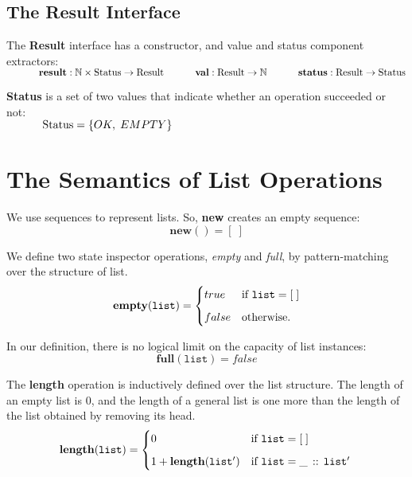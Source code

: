 \documentclass[10pt]{article}
\begin{document}
  \subsection{The Result Interface}
  The \textbf{Result} interface has a constructor, and value and status component extractors:
  \vspace*{6pt}\\\(
  \hspace*{32pt}\textbf{result}: \mathbb{N} \times \mathrm{Status} \rightarrow \mathrm{Result}\vspace*{4pt}\\
  \hspace*{32pt}\textbf{val}: \mathrm{Result} \rightarrow \mathbb{N}\vspace*{4pt}\\
  \hspace*{32pt}\textbf{status}: \mathrm{Result} \rightarrow \mathrm{Status}
  \)\vspace*{6pt}  
  
  \textbf{Status} is a set of two values that indicate whether an operation succeeded or not: 
   \vspace*{6pt}\\\(\hspace*{32pt}\mathrm{Status} = \{OK, \; EMPTY\} \)

  \section{The Semantics of List Operations}
  \noindent We use sequences to represent lists. So, \textbf{new} creates an empty sequence:
    \[
        \mathtt{\mathbf{new}()} = [\;] 
    \]
    
  \noindent We define two state inspector operations, \emph{empty} and \emph{full}, by pattern-matching over the structure of list.
    \[
        \mathtt{\mathbf{empty}(list)} = \begin{cases} true & \mbox{if  } \mathtt{list} = [\;]
        \vspace*{6pt}\\ 
        false & \mbox{otherwise}. \end{cases} 
    \]

  \noindent In our definition, there is no logical limit on the capacity of list instances:
    \[
        \mathtt{\mathbf{full}(list)} = false 
    \]
    
  \noindent The \textbf{length} operation is inductively defined over the list structure. The length of an empty list is 0, and the length of a general list is one more than the length of the list obtained by removing its head. 
    \[
        \mathtt{\mathbf{length}(list)} = \begin{cases}
            0 & \mbox{if } \mathtt{list} = [\;]\vspace*{6pt}\\
            1 + \mathtt{\mathbf{length}(list')} & \mbox{if } \mathtt{list = \_ \,::\, list'}\\
        \end{cases}\vspace*{6pt}\\
    \]
\end{document}
